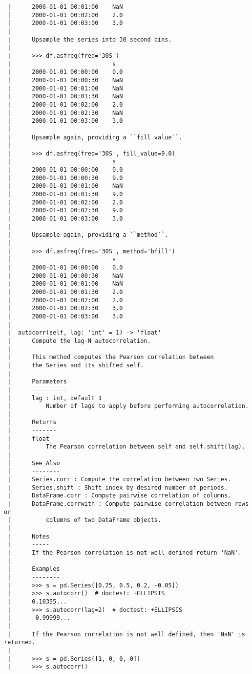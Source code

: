\documentclass[
  letterpaper,
  DIV=11,
  numbers=noendperiod]{scrreprt}
\begin{document}
\begin{verbatim}
 |      2000-01-01 00:01:00    NaN
 |      2000-01-01 00:02:00    2.0
 |      2000-01-01 00:03:00    3.0
 |      
 |      Upsample the series into 30 second bins.
 |      
 |      >>> df.asfreq(freq='30S')
 |                             s
 |      2000-01-01 00:00:00    0.0
 |      2000-01-01 00:00:30    NaN
 |      2000-01-01 00:01:00    NaN
 |      2000-01-01 00:01:30    NaN
 |      2000-01-01 00:02:00    2.0
 |      2000-01-01 00:02:30    NaN
 |      2000-01-01 00:03:00    3.0
 |      
 |      Upsample again, providing a ``fill value``.
 |      
 |      >>> df.asfreq(freq='30S', fill_value=9.0)
 |                             s
 |      2000-01-01 00:00:00    0.0
 |      2000-01-01 00:00:30    9.0
 |      2000-01-01 00:01:00    NaN
 |      2000-01-01 00:01:30    9.0
 |      2000-01-01 00:02:00    2.0
 |      2000-01-01 00:02:30    9.0
 |      2000-01-01 00:03:00    3.0
 |      
 |      Upsample again, providing a ``method``.
 |      
 |      >>> df.asfreq(freq='30S', method='bfill')
 |                             s
 |      2000-01-01 00:00:00    0.0
 |      2000-01-01 00:00:30    NaN
 |      2000-01-01 00:01:00    NaN
 |      2000-01-01 00:01:30    2.0
 |      2000-01-01 00:02:00    2.0
 |      2000-01-01 00:02:30    3.0
 |      2000-01-01 00:03:00    3.0
 |  
 |  autocorr(self, lag: 'int' = 1) -> 'float'
 |      Compute the lag-N autocorrelation.
 |      
 |      This method computes the Pearson correlation between
 |      the Series and its shifted self.
 |      
 |      Parameters
 |      ----------
 |      lag : int, default 1
 |          Number of lags to apply before performing autocorrelation.
 |      
 |      Returns
 |      -------
 |      float
 |          The Pearson correlation between self and self.shift(lag).
 |      
 |      See Also
 |      --------
 |      Series.corr : Compute the correlation between two Series.
 |      Series.shift : Shift index by desired number of periods.
 |      DataFrame.corr : Compute pairwise correlation of columns.
 |      DataFrame.corrwith : Compute pairwise correlation between rows or
 |          columns of two DataFrame objects.
 |      
 |      Notes
 |      -----
 |      If the Pearson correlation is not well defined return 'NaN'.
 |      
 |      Examples
 |      --------
 |      >>> s = pd.Series([0.25, 0.5, 0.2, -0.05])
 |      >>> s.autocorr()  # doctest: +ELLIPSIS
 |      0.10355...
 |      >>> s.autocorr(lag=2)  # doctest: +ELLIPSIS
 |      -0.99999...
 |      
 |      If the Pearson correlation is not well defined, then 'NaN' is returned.
 |      
 |      >>> s = pd.Series([1, 0, 0, 0])
 |      >>> s.autocorr()

\end{verbatim}
\end{document}
